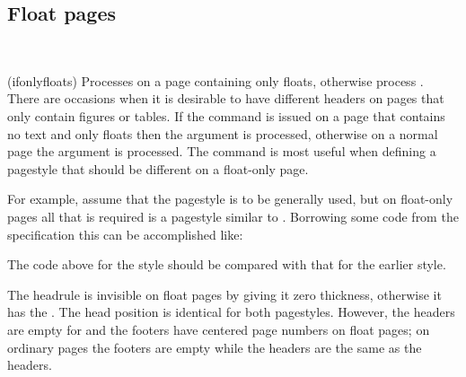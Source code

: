 \begin{plainlist}

\subsection{Float pages}


\begin{syntax}
 \\
\end{syntax}
\glossary(ifonlyfloats)%
  {}%
  {Processes  on a page containing only floats, otherwise process
  .}
    There are occasions when it is desirable to have different 
headers on pages that only contain figures 
or tables. If the command 
is issued on a page that contains no text and only floats then the 
argument is processed, otherwise on a normal page the  argument
is processed. The command is most useful when defining a pagestyle that 
should be different on a float-only page.

    For example, assume that the  pagestyle is to be
generally used, but on float-only pages all that is required is a pagestyle
similar to . Borrowing some code from the 
specification this can be accomplished like:
\begin{lcode}
%
  {\ifonlyfloats{0pt}{\normalrulethickness}}
%
             {\ifonlyfloats{}{\normalfont\bfseries\thepage}}%
             {}%
             {\ifonlyfloats{}{\normalfont\bfseries\leftmark}}
%
             {\ifonlyfloats{}{\normalfont\bfseries\rightmark}}%
             {}%
             {\ifonlyfloats{}{\normalfont\bfseries\thepage}}
\end{lcode}
The code above for the  style should be compared with 
that for the earlier  style.

    The headrule is invisible 
on float pages by giving it zero thickness, 
otherwise it has the \cmd{\normalrulethickness}. The head position is 
identical for both pagestyles. However, the headers are empty for
 and the footers have centered page numbers 
on float pages; on ordinary pages the footers are empty 
while the headers
are the same as the  headers.


\end{plainlist}
